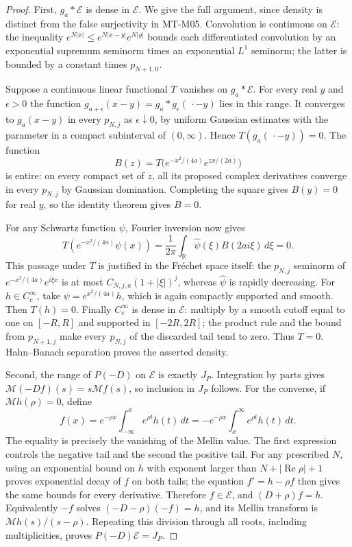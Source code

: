 \documentclass[11pt,a4paper]{article}
\begin{document}
\begin{proof}
First, $g_a*\mathcal E$ is dense in $\mathcal E$. We give the full
argument, since density is distinct from the false surjectivity in
MT-M05. Convolution is continuous on $\mathcal E$: the inequality
$e^{N|x|}\le e^{N|x-y|}e^{N|y|}$ bounds each differentiated
convolution by an exponential supremum seminorm times an exponential
$L^1$ seminorm; the latter is bounded by a constant times
$p_{N+1,0}$.

Suppose a continuous linear functional $T$ vanishes on
$g_a*\mathcal E$. For every real $y$ and $\epsilon>0$ the function
$g_{a+\epsilon}(x-y)=g_a*g_\epsilon(\,\cdot-y)$ lies in this range.
It converges to $g_a(x-y)$ in every $p_{N,j}$ as
$\epsilon\downarrow0$, by uniform Gaussian estimates with the
parameter in a compact subinterval of $(0,\infty)$. Hence
$T(g_a(\,\cdot-y))=0$. The function
\[
 B(z)=T\bigl(e^{-x^2/(4a)}e^{zx/(2a)}\bigr)
\]
is entire: on every compact set of $z$, all its proposed complex
derivatives converge in every $p_{N,j}$ by Gaussian domination.
Completing the square gives $B(y)=0$ for real $y$, so the identity
theorem gives $B=0$.

For any Schwartz function $\psi$, Fourier inversion now gives
\[
 T(e^{-x^2/(4a)}\psi(x))
  =\frac1{2\pi}\int_{\mathbb R}\widehat\psi(\xi)
        B(2ai\xi)\,d\xi=0.
\]
This passage under $T$ is justified in the Fr\'echet space itself:
the $p_{N,j}$ seminorm of
$e^{-x^2/(4a)}e^{i\xi x}$ is at most
$C_{N,j,a}(1+|\xi|)^j$, whereas $\widehat\psi$ is rapidly
decreasing. For $h\in C_c^\infty$, take
$\psi=e^{x^2/(4a)}h$, which is again compactly supported and smooth.
Then $T(h)=0$. Finally $C_c^\infty$ is dense in $\mathcal E$:
multiply by a smooth cutoff equal to one on $[-R,R]$ and supported
in $[-2R,2R]$; the product rule and the bound from $p_{N+1,j}$ make
every $p_{N,j}$ of the discarded tail tend to zero. Thus $T=0$.
Hahn--Banach separation proves the asserted density.

Second, the range of $P(-D)$ on $\mathcal E$ is exactly $J_P$.
Integration by parts gives $\mathcal M(-Df)(s)=s\mathcal Mf(s)$,
so inclusion in $J_P$ follows. For the converse, if
$\mathcal Mh(\rho)=0$, define
\[
 f(x)=e^{-\rho x}\int_{-\infty}^x e^{\rho t}h(t)\,dt
     =-e^{-\rho x}\int_x^\infty e^{\rho t}h(t)\,dt.
\]
The equality is precisely the vanishing of the Mellin value.
The first expression controls the negative tail and the second the
positive tail. For any prescribed $N$, using an exponential bound
on $h$ with exponent larger than $N+|\operatorname{Re}\rho|+1$
proves exponential decay of $f$ on both tails; the equation
$f'=h-\rho f$ then gives the same bounds for every derivative.
Therefore $f\in\mathcal E$, and $(D+\rho)f=h$.
Equivalently $-f$ solves $(-D-\rho)(-f)=h$, and its Mellin transform
is $\mathcal Mh(s)/(s-\rho)$. Repeating this division through all
roots, including multiplicities, proves $P(-D)\mathcal E=J_P$.


\end{proof}
\end{document}
